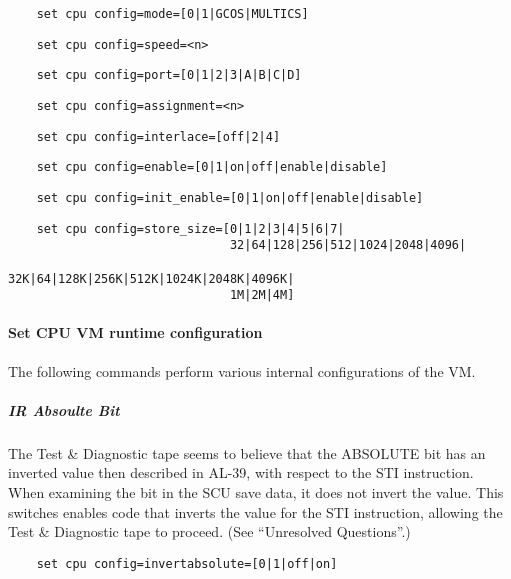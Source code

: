 \documentclass[notitlepage]{report}
\begin{document}
\begin{lstlisting}
	set cpu config=mode=[0|1|GCOS|MULTICS]
\end{lstlisting}

\begin{lstlisting}
	set cpu config=speed=<n>
\end{lstlisting}

\begin{lstlisting}
	set cpu config=port=[0|1|2|3|A|B|C|D]
\end{lstlisting}

\begin{lstlisting}
	set cpu config=assignment=<n>
\end{lstlisting}

\begin{lstlisting}
	set cpu config=interlace=[off|2|4]
\end{lstlisting}

\begin{lstlisting}
	set cpu config=enable=[0|1|on|off|enable|disable]
\end{lstlisting}

\begin{lstlisting}
	set cpu config=init_enable=[0|1|on|off|enable|disable]
\end{lstlisting}

\begin{lstlisting}
	set cpu config=store_size=[0|1|2|3|4|5|6|7|
	                           32|64|128|256|512|1024|2048|4096|
	                           32K|64|128K|256K|512K|1024K|2048K|4096K|
	                           1M|2M|4M]
\end{lstlisting}

\paragraph{Set CPU VM runtime configuration} The following commands perform various internal configurations of the VM.

\subparagraph{IR Absoulte Bit}
The Test \& Diagnostic tape seems to believe that the ABSOLUTE bit has an inverted value then
described in AL-39, with respect to the STI instruction. When examining the bit in the SCU save data, it does not invert the value. This switches enables code that inverts the value for the STI instruction, allowing the Test \& Diagnostic tape to proceed. (See ``Unresolved Questions''.)

\begin{lstlisting}
	set cpu config=invertabsolute=[0|1|off|on]
\end{lstlisting}
\end{document}
